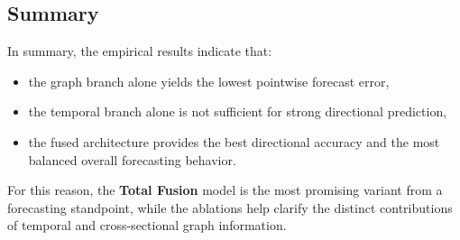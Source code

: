 \subsection{Summary}

In summary, the empirical results indicate that:

\begin{itemize}
    \item the graph branch alone yields the lowest pointwise forecast error,
    \item the temporal branch alone is not sufficient for strong directional
    prediction,
    \item the fused architecture provides the best directional accuracy and the
    most balanced overall forecasting behavior.
\end{itemize}

For this reason, the \textbf{Total Fusion} model is the most promising variant
from a forecasting standpoint, while the ablations help clarify the distinct
contributions of temporal and cross-sectional graph information.
